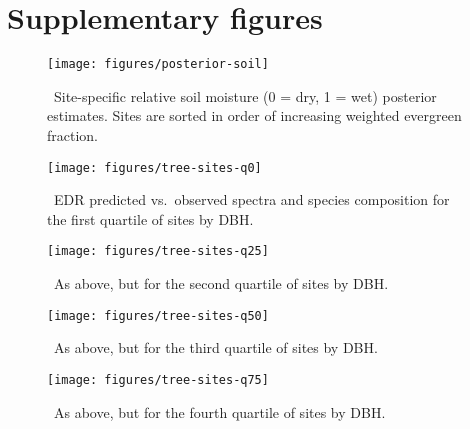 \section{Supplementary figures}

\begin{figure}[ht]
  \centering
  \texttt{[image: figures/posterior-soil]}
  \caption{\label{fig:posterior-soil}\
    Site-specific relative soil moisture (0 = dry, 1 = wet) posterior estimates.
    Sites are sorted in order of increasing weighted evergreen fraction.
  }
\end{figure}

\clearpage



\begin{figure}[ht]
  \centering
  \texttt{[image: figures/tree-sites-q0]}
  \caption{\label{fig:tree-sites-q0}\
    EDR predicted vs.\ observed spectra and species composition for the first quartile of sites by DBH.
  }
\end{figure}

\clearpage

\begin{figure}[ht]
  \centering
  \texttt{[image: figures/tree-sites-q25]}
  \caption{\label{fig:tree-sites-q25}\
    As above, but for the second quartile of sites by DBH.
  }
\end{figure}

\clearpage

\begin{figure}[ht]
  \centering
  \texttt{[image: figures/tree-sites-q50]}
  \caption{\label{fig:tree-sites-q50}\
    As above, but for the third quartile of sites by DBH.
  }
\end{figure}

\clearpage

\begin{figure}[ht]
  \centering
  \texttt{[image: figures/tree-sites-q75]}
  \caption{\label{fig:tree-sites-q75}\
    As above, but for the fourth quartile of sites by DBH.
  }
\end{figure}


